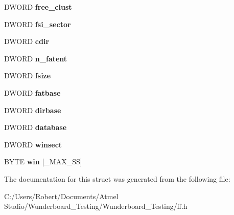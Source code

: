\begin{DoxyCompactItemize}
\item 
\hypertarget{struct_f_a_t_f_s_a5fb49e6ac511bd97eaffdd636d0e4165}{D\-W\-O\-R\-D {\bfseries free\-\_\-clust}}\label{struct_f_a_t_f_s_a5fb49e6ac511bd97eaffdd636d0e4165}

\item 
\hypertarget{struct_f_a_t_f_s_a4900e785d26dfed6e456ceeb59ec29a7}{D\-W\-O\-R\-D {\bfseries fsi\-\_\-sector}}\label{struct_f_a_t_f_s_a4900e785d26dfed6e456ceeb59ec29a7}

\item 
\hypertarget{struct_f_a_t_f_s_a217d0ce0c8cec84aa7f0c142679412c6}{D\-W\-O\-R\-D {\bfseries cdir}}\label{struct_f_a_t_f_s_a217d0ce0c8cec84aa7f0c142679412c6}

\item 
\hypertarget{struct_f_a_t_f_s_a8da50eeba6469bc20d60ca0cf9a1307c}{D\-W\-O\-R\-D {\bfseries n\-\_\-fatent}}\label{struct_f_a_t_f_s_a8da50eeba6469bc20d60ca0cf9a1307c}

\item 
\hypertarget{struct_f_a_t_f_s_a53e9560659f14e66f306c2c444198bf3}{D\-W\-O\-R\-D {\bfseries fsize}}\label{struct_f_a_t_f_s_a53e9560659f14e66f306c2c444198bf3}

\item 
\hypertarget{struct_f_a_t_f_s_a848fba02c4aabe02ef2984e578f33d64}{D\-W\-O\-R\-D {\bfseries fatbase}}\label{struct_f_a_t_f_s_a848fba02c4aabe02ef2984e578f33d64}

\item 
\hypertarget{struct_f_a_t_f_s_a3f72fd998dbcce4652a85a81fe944bc4}{D\-W\-O\-R\-D {\bfseries dirbase}}\label{struct_f_a_t_f_s_a3f72fd998dbcce4652a85a81fe944bc4}

\item 
\hypertarget{struct_f_a_t_f_s_a5b6c0bc2e9fd2ae8ef714210a74a2d5d}{D\-W\-O\-R\-D {\bfseries database}}\label{struct_f_a_t_f_s_a5b6c0bc2e9fd2ae8ef714210a74a2d5d}

\item 
\hypertarget{struct_f_a_t_f_s_ac60e69c00e6bf7c25febfbac4dc1476b}{D\-W\-O\-R\-D {\bfseries winsect}}\label{struct_f_a_t_f_s_ac60e69c00e6bf7c25febfbac4dc1476b}

\item 
\hypertarget{struct_f_a_t_f_s_a7cc35a593465e727ab87723c14610644}{B\-Y\-T\-E {\bfseries win} \mbox{[}\-\_\-\-M\-A\-X\-\_\-\-S\-S\mbox{]}}\label{struct_f_a_t_f_s_a7cc35a593465e727ab87723c14610644}

\end{DoxyCompactItemize}


The documentation for this struct was generated from the following file\-:\begin{DoxyCompactItemize}
\item 
C\-:/\-Users/\-Robert/\-Documents/\-Atmel Studio/\-Wunderboard\-\_\-\-Testing/\-Wunderboard\-\_\-\-Testing/ff.\-h\end{DoxyCompactItemize}
